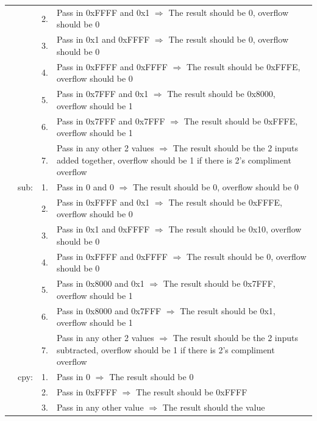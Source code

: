 \documentclass{article}
\begin{document}
\begin{longtable}{ r r r p{11cm} }
				                &      & 2. & Pass in 0xFFFF and 0x1 $\Rightarrow$ The result should be 0, overflow should be 0\\
				                &      & 3. & Pass in 0x1 and 0xFFFF $\Rightarrow$ The result should be 0, overflow should be 0\\
				                &      & 4. & Pass in 0xFFFF and 0xFFFF $\Rightarrow$ The result should be 0xFFFE, overflow should be 0\\
				                &      & 5. & Pass in 0x7FFF and 0x1 $\Rightarrow$ The result should be 0x8000, overflow should be 1\\
				                &      & 6. & Pass in 0x7FFF and 0x7FFF $\Rightarrow$ The result should be 0xFFFE, overflow should be 1\\
				                &      & 7. & Pass in any other 2 values $\Rightarrow$ The result should be the 2 inputs added together, overflow should be 1 if there is 2's compliment overflow\\
				                & sub: & 1. & Pass in 0 and 0 $\Rightarrow$ The result should be 0, overflow should be 0\\
				                &      & 2. & Pass in 0xFFFF and 0x1 $\Rightarrow$ The result should be 0xFFFE, overflow should be 0\\
				                &      & 3. & Pass in 0x1 and 0xFFFF $\Rightarrow$ The result should be 0x10, overflow should be 0\\
				                &      & 4. & Pass in 0xFFFF and 0xFFFF $\Rightarrow$ The result should be 0, overflow should be 0\\
				                &      & 5. & Pass in 0x8000 and 0x1 $\Rightarrow$ The result should be 0x7FFF, overflow should be 1\\
				                &      & 6. & Pass in 0x8000 and 0x7FFF $\Rightarrow$ The result should be 0x1, overflow should be 1\\
				                &      & 7. & Pass in any other 2 values $\Rightarrow$ The result should be the 2 inputs subtracted, overflow should be 1 if there is 2's compliment overflow\\
				                & cpy: & 1. & Pass in 0 $\Rightarrow$ The result should be 0\\
				                &      & 2. & Pass in 0xFFFF $\Rightarrow$ The result should be 0xFFFF\\
				                &      & 3. & Pass in any other value $\Rightarrow$ The result should the value\\
			\end{longtable}
\end{document}
